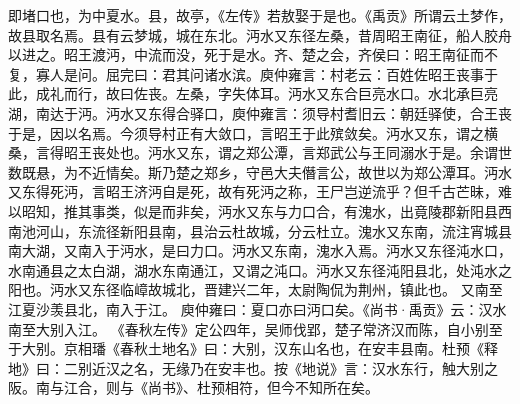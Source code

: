 \documentclass[12pt,UTF8]{ctexbook}
\begin{document}
即堵口也，为中夏水。县，故亭，《左传》若敖娶于是也。《禹贡》所谓云土梦作，故县取名焉。县有云梦城，城在东北。沔水又东径左桑，昔周昭王南征，船人胶舟以进之。昭王渡沔，中流而没，死于是水。齐、楚之会，齐侯曰：昭王南征而不复，寡人是问。屈完曰：君其问诸水滨。庾仲雍言：村老云：百姓佐昭王丧事于此，成礼而行，故曰佐丧。左桑，字失体耳。沔水又东合巨亮水口。水北承巨亮湖，南达于沔。沔水又东得合驿口，庾仲雍言：须导村耆旧云：朝廷驿使，合王丧于是，因以名焉。今须导村正有大敛口，言昭王于此殡敛矣。沔水又东，谓之横桑，言得昭王丧处也。沔水又东，谓之郑公潭，言郑武公与王同溺水于是。余谓世数既悬，为不近情矣。斯乃楚之郑乡，守邑大夫僭言公，故世以为郑公潭耳。沔水又东得死沔，言昭王济沔自是死，故有死沔之称，王尸岂逆流乎？但千古芒昧，难以昭知，推其事类，似是而非矣，沔水又东与力口合，有溾水，出竟陵郡新阳县西南池河山，东流径新阳县南，县治云杜故城，分云杜立。溾水又东南，流注宵城县南大湖，又南入于沔水，是曰力口。沔水又东南，溾水入焉。沔水又东径沌水口，水南通县之太白湖，湖水东南通江，又谓之沌口。沔水又东径沌阳县北，处沌水之阳也。沔水又东径临嶂故城北，晋建兴二年，太尉陶侃为荆州，镇此也。
又南至江夏沙羡县北，南入于江。
庾仲雍曰：夏口亦曰沔口矣。《尚书·禹贡》云：汉水南至大别入江。
《春秋左传》定公四年，吴师伐郢，楚子常济汉而陈，自小别至于大别。京相璠《春秋土地名》曰：大别，汉东山名也，在安丰县南。杜预《释地》曰：二别近汉之名，无缘乃在安丰也。按《地说》言：汉水东行，触大别之阪。南与江合，则与《尚书》、杜预相符，但今不知所在矣。
\end{document}
